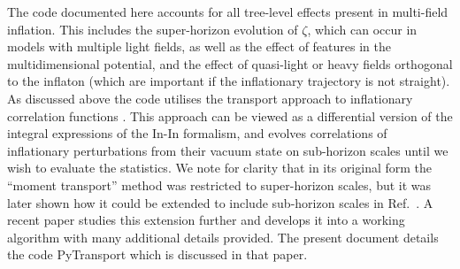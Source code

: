 \documentclass[10pt,
amsmath,amssymb,
aps,prd,nofootinbib,eqsecnum,a4paper]{revtex4}
\begin{document}
The code documented here accounts for all tree-level effects present in multi-field inflation. This includes  
the super-horizon evolution of $\zeta$, which 
can occur in models with multiple light  
fields, as well as the effect of features in the multidimensional potential, and the effect of 
quasi-light or heavy fields orthogonal to the inflaton 
(which are important if the inflationary trajectory is not straight).
As discussed above the code utilises the transport approach to inflationary correlation functions 
\cite{Mulryne:2009kh,Mulryne:2010rp,Dias:2011xy,Anderson:2012em,Seery:2012vj, Mulryne:2013uka}. This approach 
can be viewed as a differential version of the integral expressions of the In-In formalism, 
and evolves correlations of inflationary perturbations from their vacuum state on 
sub-horizon scales until we wish to evaluate the statistics. 
We note for clarity that in its original form the ``moment transport'' method was restricted 
to super-horizon scales, but it was later shown how it could be extended to include sub-horizon scales 
in Ref.~\cite{Mulryne:2013uka}. A recent paper studies this extension further and develops it into a working 
algorithm \cite{Dias:2016rjq} with many additional details provided. The present document details 
the code PyTransport which is discussed in that paper.
\end{document}
